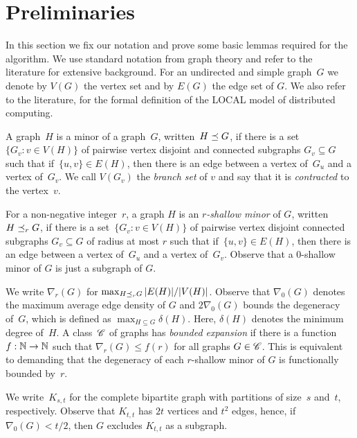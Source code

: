 
\section{Preliminaries}

In this section we fix our notation and prove some basic lemmas
required for the algorithm. We use standard notation from graph
theory and refer to the literature for extensive background. For an
undirected and simple graph~$G$ we denote by $V(G)$
the vertex set and by $E(G)$ the edge set of $G$. We also refer
to the literature, for the
formal definition of the LOCAL model of distributed computing.

A graph~$H$ is a minor of a graph~$G$, written~$H\preceq G$, if
there is a set \mbox{$\{G_v :v\in V(H)\}$} of pairwise vertex disjoint and
connected subgraphs
$G_v\subseteq G$ such that if~$\{u,v\}\in E(H)$, then there is an edge
between a vertex of~$G_u$ and a vertex of~$G_v$. We call $V(G_v)$ the
\emph{branch set} of $v$ and say that it is
\emph{contracted} to the vertex~$v$.

For a non-negative integer~$r$, a graph
$H$ is an \emph{$r$-shallow minor} of $G$, written
$H\preceq_r G$, if there is a set~$\{G_v : v\in V(H)\}$ of pairwise
vertex disjoint connected subgraphs
$G_v\subseteq G$ of radius at most $r$ such that if~$\{u,v\}\in E(H)$,
then there is an edge between a vertex of~$G_u$ and a vertex of~$G_v$.
Observe that a $0$-shallow minor of $G$ is just a subgraph of $G$.

We write $\nabla_r(G)$ for $\max_{H\preceq_r G}|E(H)|/|V(H)|$. Observe
that $\nabla_0(G)$ denotes the maximum average edge density of $G$
and $2\nabla_0(G)$ bounds the degeneracy of~$G$, which is defined
as $\max_{H\subseteq G}\delta(H)$. Here, $\delta(H)$ denotes
the minimum degree of~$H$.
%
A class~$\mathscr{C}$ of graphs has \emph{bounded expansion} if there is a function
$f:\mathbb{N}\rightarrow\mathbb{N}$ such that $\nabla_r(G)\leq f(r)$ for all graphs $G\in \mathscr{C}$.
This is equivalent to demanding that the degeneracy of each $r$-shallow minor
of $G$ is functionally bounded by~$r$.

We write~$K_{s,t}$ for the complete bipartite
graph with partitions of size~$s$ and~$t$, respectively. Observe that
$K_{t,t}$ has $2t$ vertices and $t^2$ edges, hence, if
\mbox{$\nabla_0(G)< t/2$}, then $G$ excludes $K_{t,t}$ as a subgraph.

